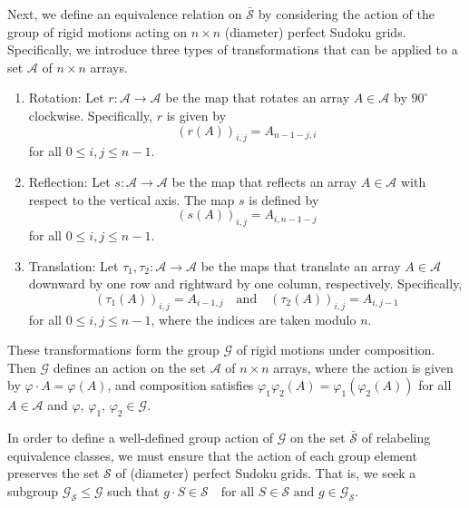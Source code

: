 \documentclass{article}
\theoremstyle{definition}
\begin{document}
Next, we define an equivalence relation on $\bar{\mathcal{S}}$ by considering the action of the group of rigid motions acting on $n \times n$ (diameter) perfect Sudoku grids. Specifically, we introduce three types of transformations that can be applied to a set $\mathcal{A}$ of $n\times n$ arrays.
\begin{enumerate}
\item[(i)] Rotation: Let $r:\mathcal{A}\to\mathcal{A}$ be the map that rotates an array $A\in\mathcal{A}$ by $90^\circ$ clockwise. Specifically, $r$ is given by
	\[(r(A))_{i,j}=A_{n-1-j, i}\]
	for all $0\le i, j\le n-1$.
\item[(ii)] Reflection: Let $s:\mathcal{A}\to\mathcal{A}$ be the map that reflects an array $A\in\mathcal{A}$ with respect to the vertical axis. The map $s$ is defined by
	\[(s(A))_{i, j}=A_{i, n-1-j}
	\]
	for all $0\le i, j\le n-1$.
\item[(iii)] Translation: Let $\tau_1, \tau_2:\mathcal{A}\to\mathcal{A}$ be the maps that translate an array $A\in\mathcal{A}$ downward by one row and rightward by one column, respectively. Specifically,
	\[(\tau_1(A))_{i, j}=A_{i-1, j}\quad\mbox{and}\quad (\tau_2(A))_{i,j}=A_{i, j-1}\]
	for all $0\le i, j\le n-1$, where the indices are taken modulo $n$.
\end{enumerate}
These transformations form the group $\mathcal{G}$ of rigid motions under composition. Then $\mathcal{G}$ defines an action on the set $\mathcal{A}$ of $n \times n$ arrays, where the action is given by $\varphi \cdot A = \varphi(A)$, and composition satisfies $\varphi_1\varphi_2(A)=\varphi_1(\varphi_2(A))$ for all $A \in \mathcal{A}$ and $\varphi,\, \varphi_1,\, \varphi_2\in \mathcal{G}$.

In order to define a well-defined group action of $\mathcal{G}$ on the set $\bar{\mathcal{S}}$ of relabeling equivalence classes, we must ensure that the action of each group element preserves the set $\mathcal{S}$ of (diameter) perfect Sudoku grids. That is, we seek a subgroup $\mathcal{G}_\mathcal{S} \leq \mathcal{G}$ such that
	$g \cdot S \in \mathcal{S} \quad \text{for all } S \in \mathcal{S} \text{ and } g \in \mathcal{G}_\mathcal{S}.$
\end{document}
